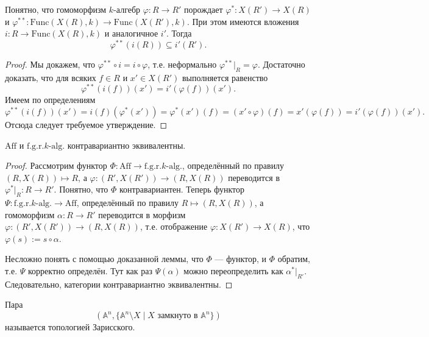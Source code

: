 \documentclass[12pt,a4paper]{article}
\renewcommand{\AA}{\ensuremath{\mathbb{A}}\xspace}
\newcommand{\Func}{\mathrm{Func}}
\newcommand{\Aff}{\mathrm{Aff}}
\newcommand{\fgrkalg}[1][k]{\text{f.g.r.$#1$-alg.}}
\begin{document}
    \begin{lemma}
        Понятно, что гомоморфизм $k$-алгебр $\varphi: R \to R'$ порождает $\varphi^*: X(R') \to X(R)$ и $\varphi^{**}: \Func(X(R), k) \to \Func(X(R'), k)$. При этом имеются вложения $i: R \to \Func(X(R), k)$ и аналогичное $i'$. Тогда
        \[\varphi^{**}(i(R)) \subseteq i'(R').\]
    \end{lemma}

    \begin{proof}
        Мы докажем, что $\varphi^{**} \circ i = i \circ \varphi$, т.е. неформально $\varphi^{**}|_R = \varphi$. Достаточно доказать, что для всяких $f \in R$ и $x' \in X(R')$ выполняется равенство
        \[\varphi^{**}(i(f))(x') = i'(\varphi(f))(x').\]
        Имеем по определениям
        \[\varphi^{**}(i(f))(x') = i(f)(\varphi^*(x')) = \varphi^*(x')(f) = (x' \circ \varphi)(f) = x'(\varphi(f)) = i'(\varphi(f))(x').\]
        Отсюда следует требуемое утверждение.
    \end{proof}

    \begin{theorem}
        $\Aff$ и $\fgrkalg$ контравариантно эквивалентны.
    \end{theorem}

    \begin{proof}
        Рассмотрим функтор $\Phi: \Aff \to \fgrkalg$, определённый по правилу $(R, X(R)) \mapsto R$, а $\varphi: (R', X(R')) \to (R, X(R))$ переводится в $\varphi^*|_R: R \to R'$. Понятно, что $\Phi$ контравариантен. Теперь функтор $\Psi: \fgrkalg \to \Aff$, определённый по правилу $R \mapsto (R, X(R))$, а гомоморфизм $\alpha: R \to R'$ переводится в морфизм $\varphi: (R', X(R')) \to (R, X(R))$, т.е. отображение $\varphi: X(R') \to X(R)$, что $\varphi(s) := s \circ \alpha$.

        Несложно понять с помощью доказанной леммы, что $\Phi$ --- функтор, и $\Phi$ обратим, т.е. $\Psi$ корректно определён. Тут как раз $\Psi(\alpha)$ можно переопределить как $\alpha^*|_{R'}$. Следовательно, категории контравариантно эквивалентны.
    \end{proof}

    \begin{definition}
        Пара
        \[(\AA^n, \{\AA^n \setminus X \mid X \text{ замкнуто в } \AA^n\})\]
        называется топологией Зарисского.
    \end{definition}

\end{document}

